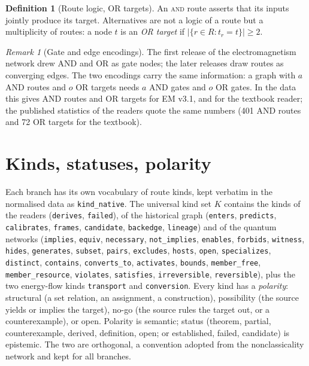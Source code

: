 \documentclass[11pt,a4paper,twoside,openany]{report}
\theoremstyle{plain}
\theoremstyle{definition}
\newtheorem{definition}[theorem]{Definition}
\theoremstyle{remark}
\newtheorem{remark}[theorem]{Remark}
\newcommand{\id}[1]{\texttt{#1}}
\begin{document}
\begin{definition}[Route logic, OR targets]\label{def:logic}
An \textsc{and} route asserts that its inputs jointly produce its target. Alternatives are not a logic of a route but a multiplicity of routes: a node $t$ is an \emph{OR target} if $|\{r\in R: t_r=t\}|\ge 2$.
\end{definition}
\begin{remark}[Gate and edge encodings]
The first release of the electromagnetism network drew AND and OR as gate nodes; the later releases draw routes as converging edges. The two encodings carry the same information: a graph with $a$ AND routes and $o$ OR targets needs $a$ AND gates and $o$ OR gates. In the data this gives \NEMAND{} AND routes and \NEMortargets{} OR targets for EM v3.1, \NUPAND{} and \NUPortargets{} for the textbook reader; the published statistics of the readers quote the same numbers (401 AND routes and 72 OR targets for the textbook).
\end{remark}

\section{Kinds, statuses, polarity}
Each branch has its own vocabulary of route kinds, kept verbatim in the normalised data as \texttt{kind\_native}. The universal kind set $K$ contains the kinds of the readers (\id{derives}, \id{failed}), of the historical graph (\id{enters}, \id{predicts}, \id{calibrates}, \id{frames}, \id{candidate}, \id{backedge}, \id{lineage}) and of the quantum networks (\id{implies}, \id{equiv}, \id{necessary}, \id{not\_implies}, \id{enables}, \id{forbids}, \id{witness}, \id{hides}, \id{generates}, \id{subset}, \id{pairs}, \id{excludes}, \id{hosts}, \id{open}, \id{specializes}, \id{distinct}, \id{contains}, \id{converts\_to}, \id{activates}, \id{bounds}, \id{member\_free}, \id{member\_resource}, \id{violates}, \id{satisfies}, \id{irreversible}, \id{reversible}), plus the two energy-flow kinds \id{transport} and \id{conversion}. Every kind has a \emph{polarity}: structural (a set relation, an assignment, a construction), possibility (the source yields or implies the target), no-go (the source rules the target out, or a counterexample), or open. Polarity is semantic; status (theorem, partial, counterexample, derived, definition, open; or established, failed, candidate) is epistemic. The two are orthogonal, a convention adopted from the nonclassicality network and kept for all branches.
\end{document}
